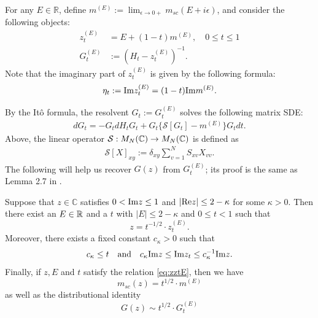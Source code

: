 \begin{definition}\label{def_flow}
For any $E \in \mathbb R$,  define $
m^{(E)}:=\lim_{\epsilon\to 0+}m_{sc}(E+i \epsilon)$, and consider the following objects:
\begin{align*}
  z^{(E)}_t&=E+(1-t) m^{(E)}  ,\quad 0\le t\le 1 \\
  G_{t}^{(E)}&:=(H_{t}-z^{(E)}_{t})^{-1}.
\end{align*}
Note that the imaginary part of $z_{t}^{(E)}$ is given by the following formula:
\begin{align}\label{eta}
\eta_t := \mathrm{Im}  z^{(E)}_t =  (1-t)  \mathrm{Im} m^{(E)}.
\end{align}
\end{definition}
 
By the It\^o formula, the resolvent $G_{t} := G_{t}^{(E)}$ solves the following matrix SDE:
\begin{align}\nonumber
dG_{t}=-G_{t}dH_{t}G_{t}+G_{t}\{\mathcal{S}[G_{t}]-m^{(E)}\}G_{t}
dt.
\end{align}
Above, the linear operator $\mathcal{S}:M_{N}(\mathbb C)\to M_{N}(\mathbb C)$ is defined as
\begin{align*}
\mathcal{S}[X]_{xy}:=\delta_{xy}\sum_{v=1}^{N}S_{xv}X_{vv}.
\end{align*}
The following will help us recover $G(z)$ from $G^{(E)}_{t}$; its proof is the same as Lemma 2.7 in \cite{YY_25}.
\begin{lemma}\label{zztE}
    Suppose that $z\in \mathbb C$ satisfies $0 <  \mathrm{Im} z\le 1$ and $|\mathrm{Re} z|\le  2-\kappa$ for some $\kappa>0$. Then there exist an $E\in\mathbb{R}$ and a $t$ with $|E|\le 2-\kappa$ and $0\le  t<1$ such that
 \begin{equation}\label{eq:zztE}
     z=t^{-1/2}\cdot z^{(E)}_t.
 \end{equation}
 Moreover, there  exists a fixed constant $c_\kappa>0$ such that 
  \begin{equation}\label{eq:zztE2}
       c_\kappa\le t\quad {\rm and}\quad  c_\kappa\mathrm{Im} z\le \mathrm{Im} z_t\le c_\kappa^{-1}\mathrm{Im} z.
  \end{equation} 
Finally, if $z,E$ and $t$ satisfy the relation \eqref{eq:zztE}, then we have 
\begin{equation}\label{mtEmz}
  m_{sc}(z)=t^{1/2}\cdot m^{(E)} %
\end{equation}
as well as the distributional identity
   \begin{equation}\label{GtEGz}
    G(z) \sim t^{ 1/2}\cdot G_t^{(E)} 
   \end{equation}
\end{lemma}
 

